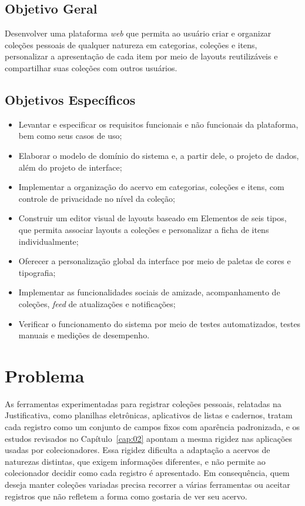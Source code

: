 \subsection{Objetivo Geral}

Desenvolver uma plataforma \textit{web} que permita ao usuário criar e organizar coleções pessoais de qualquer natureza em categorias, coleções e itens, personalizar a apresentação de cada item por meio de layouts reutilizáveis e compartilhar suas coleções com outros usuários.

\subsection{Objetivos Específicos}
\label{subsec:objetivosEspecificos}
\begin{itemize}
	\item Levantar e especificar os requisitos funcionais e não funcionais da plataforma, bem como seus casos de uso;
	\item Elaborar o modelo de domínio do sistema e, a partir dele, o projeto de dados, além do projeto de interface;
	\item Implementar a organização do acervo em categorias, coleções e itens, com controle de privacidade no nível da coleção;
	\item Construir um editor visual de layouts baseado em Elementos de seis tipos, que permita associar layouts a coleções e personalizar a ficha de itens individualmente;
	\item Oferecer a personalização global da interface por meio de paletas de cores e tipografia;
	\item Implementar as funcionalidades sociais de amizade, acompanhamento de coleções, \textit{feed} de atualizações e notificações;
	\item Verificar o funcionamento do sistema por meio de testes automatizados, testes manuais e medições de desempenho.
\end{itemize}

\section{Problema}

As ferramentas experimentadas para registrar coleções pessoais, relatadas na Justificativa, como planilhas eletrônicas, aplicativos de listas e cadernos, tratam cada registro como um conjunto de campos fixos com aparência padronizada, e os estudos revisados no Capítulo~\ref{cap:02} apontam a mesma rigidez nas aplicações usadas por colecionadores. Essa rigidez dificulta a adaptação a acervos de naturezas distintas, que exigem informações diferentes, e não permite ao colecionador decidir como cada registro é apresentado. Em consequência, quem deseja manter coleções variadas precisa recorrer a várias ferramentas ou aceitar registros que não refletem a forma como gostaria de ver seu acervo.

